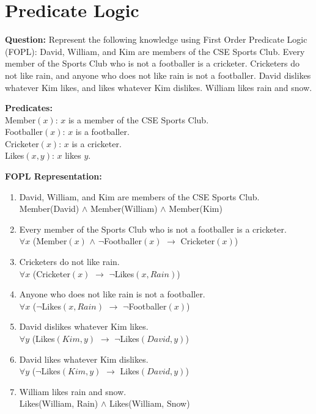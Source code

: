 \chapter{Predicate Logic}

\textbf{Question:} Represent the following knowledge using First Order Predicate Logic (FOPL): David, William, and Kim are members of the CSE Sports Club. Every member of the Sports Club who is not a footballer is a cricketer. Cricketers do not like rain, and anyone who does not like rain is not a footballer. David dislikes whatever Kim likes, and likes whatever Kim dislikes. William likes rain and snow.


\textbf{Predicates:}\\
Member$(x)$: $x$ is a member of the CSE Sports Club.\\
Footballer$(x)$: $x$ is a footballer.\\
Cricketer$(x)$: $x$ is a cricketer.\\
Likes$(x, y)$: $x$ likes $y$.

\textbf{FOPL Representation:}
\begin{enumerate}[itemsep=5pt, topsep=-0.75em]
   \item David, William, and Kim are members of the CSE Sports Club.\\
   Member(David) $\land$
   Member(William) $\land$
   Member(Kim)
   
   \item Every member of the Sports Club who is not a footballer is a cricketer.\\
   $\forall x$ (Member$(x)$ $\land$ $\neg$Footballer$(x)$ $\rightarrow$ Cricketer$(x)$)

   \item Cricketers do not like rain.\\
   $\forall x$ (Cricketer$(x)$ $\rightarrow$ $\neg$Likes$(x, Rain)$)
   
   \item Anyone who does not like rain is not a footballer.\\
   $\forall x$ ($\neg$Likes$(x, Rain)$ $\rightarrow$ $\neg$Footballer$(x)$)

   \item David dislikes whatever Kim likes.\\
   $\forall y$ (Likes$(Kim, y)$ $\rightarrow$ $\neg$Likes$(David, y)$)

   \item David likes whatever Kim dislikes.\\
   $\forall y$ ($\neg$Likes$(Kim, y)$ $\rightarrow$ Likes$(David, y)$)

   \item William likes rain and snow.\\
   Likes(William, Rain) $\land$
   Likes(William, Snow)
\end{enumerate}

